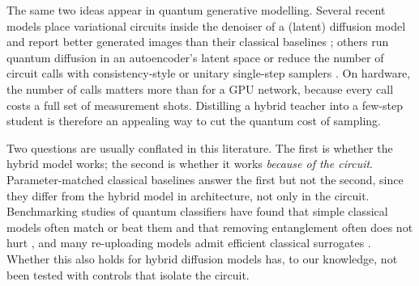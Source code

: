 \documentclass[11pt]{article}
\begin{document}
The same two ideas appear in quantum generative modelling. Several recent
models place variational circuits inside the denoiser of a (latent) diffusion
model and report better generated images than their classical baselines
\citep{defalco2024efficient,defalco2025qldm,yeteraydeniz2025medical}; others run
quantum diffusion in an autoencoder's latent space \citep{qian2026hybrid} or
reduce the number of circuit calls with consistency-style or unitary single-step
samplers \citep{kolle2024qddm,zhang2025oqiddm}. On hardware, the number of calls
matters more than for a GPU network, because every call costs a full set of
measurement shots. Distilling a hybrid teacher into a few-step student is
therefore an appealing way to cut the quantum cost of sampling.

Two questions are usually conflated in this literature. The first is whether
the hybrid model works; the second is whether it works \emph{because of the
circuit}. Parameter-matched classical baselines answer the first but not the
second, since they differ from the hybrid model in architecture, not only in
the circuit. Benchmarking studies of quantum classifiers have found that
simple classical models often match or beat them and that removing
entanglement often does not hurt \citep{bowles2024better}, and many
re-uploading models admit efficient classical surrogates
\citep{schreiber2023surrogates,landman2023rff}. Whether this also holds for
hybrid diffusion models has, to our knowledge, not been tested with controls that
isolate the circuit.
\end{document}

